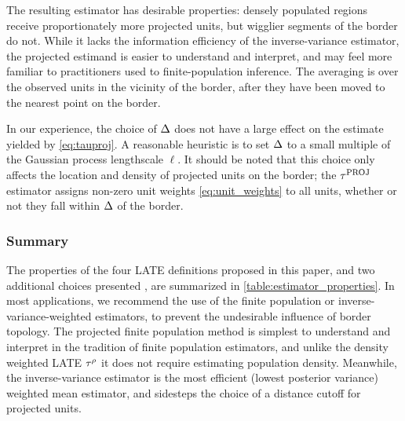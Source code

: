 The resulting estimator has desirable properties: densely populated regions receive proportionately more projected units, but wigglier segments of the border do not.
While it lacks the information efficiency of the inverse-variance estimator,
the projected estimand is easier to understand and interpret,
and may feel more familiar to practitioners used to finite-population inference.
The averaging is over the observed units in the vicinity of the border, after they have been moved to the nearest point on the border.

In our experience, the choice of \(\Delta\) does not have a large effect on the estimate yielded by \autoref{eq:tauproj}.
A reasonable heuristic is to set \(\Delta\) to a small multiple of the Gaussian process lengthscale \(\ell\).
It should be noted that this choice only affects the location and density of projected units on the border; the \(\tau^{\mathrm{PROJ}}\) estimator assigns non-zero unit weights \autoref{eq:unit_weights} to all units, whether or not they fall within \(\Delta\) of the border.

\subsubsection{Summary}
\label{sec:summary}

The properties of the four LATE definitions proposed in this paper, and two additional choices presented \ofsupp{}, are summarized in \autoref{table:estimator_properties}.
In most applications, we recommend the use of the finite population or inverse-variance-weighted estimators, to prevent the undesirable influence of border topology.
The projected finite population method is simplest to understand and interpret in the tradition of finite population estimators, and unlike the density weighted LATE \(\tau^{\rho}\) it does not require estimating population density.
Meanwhile, the inverse-variance estimator is the most efficient (lowest posterior variance) weighted mean estimator,
and sidesteps the choice of a distance cutoff for projected units.

